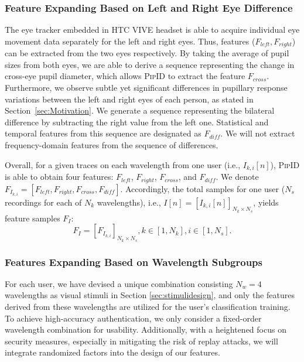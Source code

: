\documentclass[sigconf]{acmart}
\newcommand{\sysname}{\textsc{PipID}\xspace}
\begin{document}
\subsubsection{Feature Expanding Based on Left and Right Eye Difference}\label{sec:feature:expanding}
The eye tracker embedded in HTC VIVE headset is able to acquire individual eye movement data separately for the left and right eyes. Thus, features ($F_{left}, F_{right}$) can be extracted from the two eyes respectively. By taking the average of pupil sizes from both eyes, we are able to derive a sequence representing the change in cross-eye pupil diameter, which allows \sysname to extract the feature $F_{cross}$. Furthermore, we observe subtle yet significant differences in pupillary response variations between the left and right eyes of each person, as stated in Section~\ref{sec:Motivation}. We generate a sequence representing the bilateral difference by subtracting the right value from the left one. Statistical and temporal features from this sequence are designated as $F_{diff}$. We will not extract frequency-domain features from the sequence of differences. 

Overall, for a given traces on each wavelength from one user (i.e., $I_{k,i}[n]$), \sysname is able to obtain four features: $F_{left}$, $F_{right}$, $F_{cross}$, and $F_{diff}$. We denote $F_{I_{k,i}} = [F_{left}, F_{right}, F_{cross}, F_{diff}]$. Accordingly, the total samples for one user ($N_s$ recordings for each of $N_k$ wavelengths), i.e., $I[n] = [I_{k,i}[n]]_{N_k \times N_s}$, yields feature samples $F_I$:
\begin{equation}
    F_I = [F_{I_{k,i}}]_{N_k \times N_s}, k \in [1, N_k], i \in [1, N_s].
\end{equation}

\subsubsection{Features Expanding Based on Wavelength Subgroups}
For each user, we have devised a unique combination consisting $N_w=4$ wavelengths as visual stimuli in Section \ref{sec:stimulidesign}, and only the features derived from these wavelengths are utilized for the user's classification training. To achieve high-accuracy authentication, we only consider a fixed-order wavelength combination for usability. Additionally, with a heightened focus on security measures, especially in mitigating the risk of replay attacks, we will integrate randomized factors into the design of our features.
\end{document}
